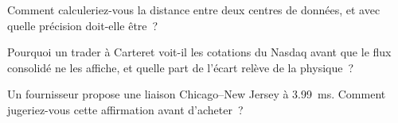 \begin{interviewq}\label{iq:nw:the-north-american-map:4}
Comment calculeriez-vous la distance entre deux centres de données, et avec quelle précision doit-elle être~?
\end{interviewq}

\begin{interviewq}\label{iq:nw:the-north-american-map:5}
Pourquoi un trader à Carteret voit-il les cotations du Nasdaq avant que le flux consolidé ne les affiche, et quelle part de l'écart relève de la physique~?
\end{interviewq}

\begin{interviewq}\label{iq:nw:the-north-american-map:6}
Un fournisseur propose une liaison Chicago--New Jersey à \qty{3.99}{\milli\second}. Comment jugeriez-vous cette affirmation avant d'acheter~?
\end{interviewq}
